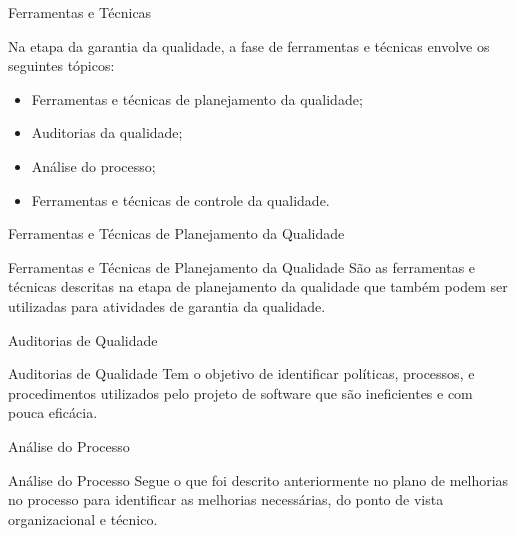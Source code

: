 \documentclass[xcolor=x11names,compress]{beamer}
\begin{document}
\begin{frame}{Ferramentas e Técnicas}

Na etapa da garantia da qualidade, a fase de ferramentas e técnicas envolve os seguintes tópicos:

\begin{itemize}
\itemsep 5mm

\item Ferramentas e técnicas de planejamento da qualidade;

\item Auditorias da qualidade;

\item Análise do processo;

\item Ferramentas e técnicas de controle da qualidade. 

\end{itemize}

\end{frame}

\begin{frame}{Ferramentas e Técnicas de Planejamento da Qualidade}

\begin{alertblock}{Ferramentas e Técnicas de Planejamento da Qualidade}
São as ferramentas e técnicas descritas na etapa de planejamento da qualidade que também podem ser utilizadas para atividades de garantia da qualidade.
\end{alertblock}

\end{frame}

\begin{frame}{Auditorias de Qualidade}

\begin{alertblock}{Auditorias de Qualidade}
Tem o objetivo de identificar políticas, processos, e procedimentos utilizados pelo projeto de software que são ineficientes e com pouca eficácia. 
\end{alertblock}

\end{frame}

\begin{frame}{Análise do Processo}

\begin{alertblock}{Análise do Processo}
Segue o que foi descrito anteriormente no plano de melhorias no processo para identificar as melhorias necessárias, do ponto de vista organizacional e técnico.
\end{alertblock}

\end{frame}
\end{document}
